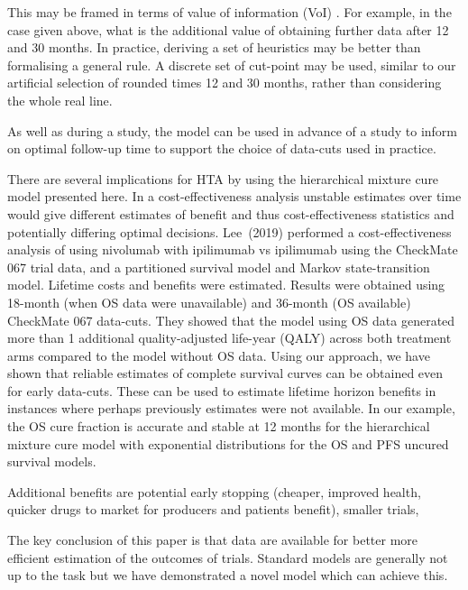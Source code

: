 \documentclass[AMA,STIX1COL]{WileyNJD-v2}
\begin{document}
This may be framed in terms of value of information (VoI) \citep{Heath2017}.
For example, in the case given above, what is the additional value of obtaining further data after 12 and 30 months.
In practice, deriving a set of heuristics may be better than formalising a general rule.
A discrete set of cut-point may be used, similar to our artificial selection of rounded times 12 and 30 months, rather than considering the whole real line.

As well as during a study, the model can be used in advance of a study to inform on optimal follow-up time to support the choice of data-cuts used in practice.

There are several implications for HTA by using the hierarchical mixture cure model presented here.
In a cost-effectiveness analysis unstable estimates over time would give different estimates of benefit and thus cost-effectiveness statistics and potentially differing optimal decisions.
Lee~(2019)\cite{Lee2019} performed a cost-effectiveness analysis of using nivolumab with ipilimumab vs ipilimumab using the CheckMate 067 trial data, and a partitioned survival model and Markov state-transition model. Lifetime costs and benefits were estimated.
Results were obtained using 18-month (when OS data were unavailable) and 36-month (OS available) CheckMate 067 data-cuts. They showed that the model using OS data generated more than 1 additional quality-adjusted life-year (QALY) across both treatment arms compared to the model without OS data.
Using our approach, we have shown that reliable estimates of complete survival curves can be obtained even for early data-cuts. These can be used to estimate lifetime horizon benefits in instances where perhaps previously estimates were not available.
In our example, the OS cure fraction is accurate and stable at 12 months for the hierarchical mixture cure model with exponential distributions for the OS and PFS uncured survival models.

Additional benefits are potential early stopping (cheaper, improved health, quicker drugs to market for producers and patients benefit),
smaller trials,

The key conclusion of this paper is that data are available for better more efficient estimation of the outcomes of trials. Standard models are generally not up to the task but we have demonstrated a novel model which can achieve this.

\end{document}
